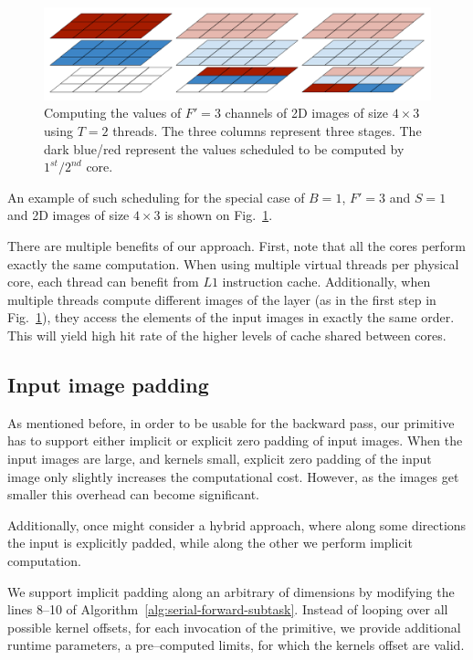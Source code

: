   \begin{figure}
    \begin{center}
      \includegraphics[width=0.97\linewidth]{fig/static2}
    \end{center}
    \caption{Computing the values of $F'=3$ channels of 2D images of
      size $4 \times 3$ using $T=2$ threads.  The three columns
      represent three stages.  The dark blue/red represent the values
      scheduled to be computed by $1^{st}/2^{nd}$ core.}
    \label{fig:problem-subdivision}
  \end{figure}

  An example of such scheduling for the special case of $B=1$, $F'=3$
  and $S=1$ and 2D images of size $4 \times 3$ is shown on
  Fig.~\ref{fig:problem-subdivision}.

  There are multiple benefits of our approach.  First, note that all
  the cores perform exactly the same computation.  When using multiple
  virtual threads per physical core, each thread can benefit from $L1$
  instruction cache.  Additionally, when multiple threads compute
  different images of the layer (as in the first step in
  Fig.~\ref{fig:problem-subdivision}), they access the elements of the
  input images in exactly the same order.  This will yield high hit
  rate of the higher levels of cache shared between cores.

  \subsection{Input image padding}

  As mentioned before, in order to be usable for the backward pass,
  our primitive has to support either implicit or explicit zero
  padding of input images.  When the input images are large, and
  kernels small, explicit zero padding of the input image only
  slightly increases the computational cost.  However, as the images
  get smaller this overhead can become significant.

  Additionally, once might consider a hybrid approach, where along
  some directions the input is explicitly padded, while along the
  other we perform implicit computation.

  We support implicit padding along an arbitrary of dimensions by
  modifying the lines 8--10 of
  Algorithm~\ref{alg:serial-forward-subtask}.  Instead of looping over
  all possible kernel offsets, for each invocation of the primitive,
  we provide additional runtime parameters, a pre--computed limits,
  for which the kernels offset are valid.
